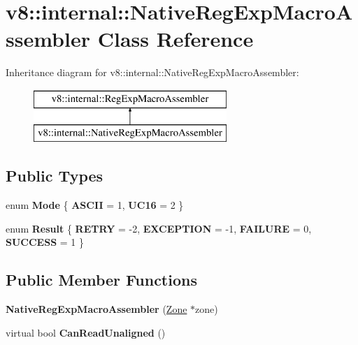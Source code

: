 \hypertarget{classv8_1_1internal_1_1_native_reg_exp_macro_assembler}{}\section{v8\+:\+:internal\+:\+:Native\+Reg\+Exp\+Macro\+Assembler Class Reference}
\label{classv8_1_1internal_1_1_native_reg_exp_macro_assembler}
Inheritance diagram for v8\+:\+:internal\+:\+:Native\+Reg\+Exp\+Macro\+Assembler\+:\begin{figure}[H]
\begin{center}
\leavevmode
\includegraphics[height=2.000000cm]{classv8_1_1internal_1_1_native_reg_exp_macro_assembler}
\end{center}
\end{figure}
\subsection*{Public Types}
\begin{DoxyCompactItemize}
\item 
\hypertarget{classv8_1_1internal_1_1_native_reg_exp_macro_assembler_a0d5534efccb56e5c02e89be0081f406a}{}enum {\bfseries Mode} \{ {\bfseries A\+S\+C\+I\+I} = 1, 
{\bfseries U\+C16} = 2
 \}\label{classv8_1_1internal_1_1_native_reg_exp_macro_assembler_a0d5534efccb56e5c02e89be0081f406a}

\item 
\hypertarget{classv8_1_1internal_1_1_native_reg_exp_macro_assembler_a454f330d24fa368c4ea0ff628f1d28f1}{}enum {\bfseries Result} \{ {\bfseries R\+E\+T\+R\+Y} = -\/2, 
{\bfseries E\+X\+C\+E\+P\+T\+I\+O\+N} = -\/1, 
{\bfseries F\+A\+I\+L\+U\+R\+E} = 0, 
{\bfseries S\+U\+C\+C\+E\+S\+S} = 1
 \}\label{classv8_1_1internal_1_1_native_reg_exp_macro_assembler_a454f330d24fa368c4ea0ff628f1d28f1}

\end{DoxyCompactItemize}
\subsection*{Public Member Functions}
\begin{DoxyCompactItemize}
\item 
\hypertarget{classv8_1_1internal_1_1_native_reg_exp_macro_assembler_a965230c9b91eed32674dcb6c626f2f7c}{}{\bfseries Native\+Reg\+Exp\+Macro\+Assembler} (\hyperlink{classv8_1_1internal_1_1_zone}{Zone} $\ast$zone)\label{classv8_1_1internal_1_1_native_reg_exp_macro_assembler_a965230c9b91eed32674dcb6c626f2f7c}

\item 
\hypertarget{classv8_1_1internal_1_1_native_reg_exp_macro_assembler_a1003ca71e0d3be0be6b29bcbd88c8d2f}{}virtual bool {\bfseries Can\+Read\+Unaligned} ()\label{classv8_1_1internal_1_1_native_reg_exp_macro_assembler_a1003ca71e0d3be0be6b29bcbd88c8d2f}

\end{DoxyCompactItemize}
